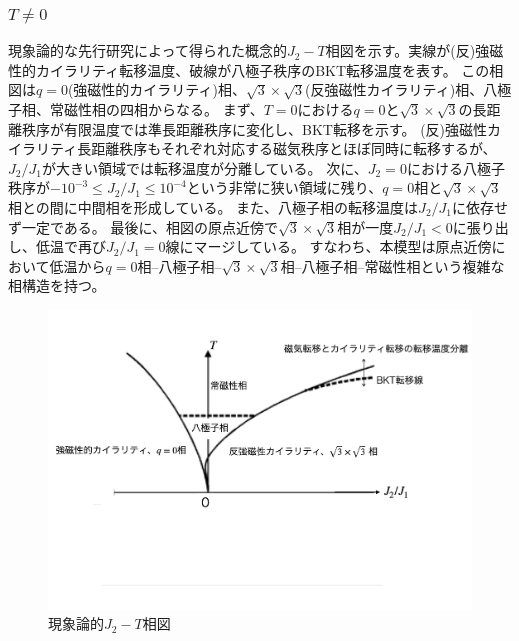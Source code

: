 \documentclass[12pt,titlepage,dvipdfmx]{jarticle}
\begin{document}
\subsubsection{$T≠0$}
現象論的な先行研究によって得られた概念的$J_2-T$相図を示す\cite{Korshunov2002}。実線が(反)強磁性的カイラリティ転移温度、破線が八極子秩序のBKT転移温度を表す。
この相図は$q=0$(強磁性的カイラリティ)相、$\sqrt{3}\times\sqrt{3}$(反強磁性カイラリティ)相、八極子相、常磁性相の四相からなる。
まず、$T=0$における$q=0$と$\sqrt{3}\times\sqrt{3}$の長距離秩序が有限温度では準長距離秩序に変化し、BKT転移を示す。
(反)強磁性カイラリティ長距離秩序もそれぞれ対応する磁気秩序とほぼ同時に転移するが、$J_2/J_1$が大きい領域では転移温度が分離している。
次に、$J_2=0$における八極子秩序が$-10^{-3}\le J_2/J_1\le 10^{-4}$という非常に狭い領域に残り、$q=0$相と$\sqrt{3}\times\sqrt{3}$相との間に中間相を形成している。
また、八極子相の転移温度は$J_2/J_1$に依存せず一定である。
最後に、相図の原点近傍で$\sqrt{3}\times\sqrt{3}$相が一度$J_2/J_1<0$に張り出し、低温で再び$J_2/J_1=0$線にマージしている。
すなわち、本模型は原点近傍において低温から$q=0$相--八極子相--$\sqrt{3}\times\sqrt{3}相$--八極子相--常磁性相という複雑な相構造を持つ。
\begin{figure}[H]
   \centering
   \includegraphics[scale=0.5]{figure/schematic_phase_diagram.pdf}
   \caption{現象論的$J_2-T$相図}
\end{figure}

\end{document}
